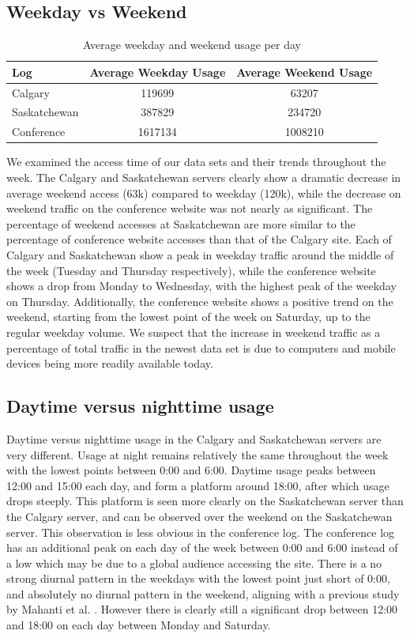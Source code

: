 \documentclass[10pt,conference]{IEEEtran}
\begin{document}
\subsection{Weekday vs Weekend} %
\label{sub:weekday_vs_weekend}
\begin{table}[h]
    \caption{Average weekday and weekend usage per day}\label{tab:weeklyusage}
    \begin{tabular}{l | c c}
        Log & Average Weekday Usage & Average Weekend Usage\\
        \hline
        Calgary & 119699 & 63207\\
        Saskatchewan & 387829 & 234720\\
        Conference & 1617134 & 1008210
    \end{tabular}
\end{table}

We examined the access time of our data sets and their trends throughout the week. The Calgary and Saskatchewan servers clearly show a dramatic decrease in average weekend access (63k) compared to weekday (120k), while the decrease on weekend traffic on the conference website was not nearly as significant. The percentage of weekend accesses at Saskatchewan are more similar to the percentage of conference website accesses than that of the Calgary site. Each of Calgary and Saskatchewan show a peak in weekday traffic around the middle of the week (Tuesday and Thursday respectively), while the conference website shows a drop from Monday to Wednesday, with the highest peak of the weekday on Thursday. Additionally, the conference website shows a positive trend on the weekend, starting from the lowest point of the week on Saturday, up to the regular weekday volume. We suspect that the increase in weekend traffic as a percentage of total traffic in the newest data set is due to computers and mobile devices being more readily available today.

\subsection{Daytime versus nighttime usage} %
\label{sub:daytime_versus_nighttime_usage}
Daytime versus nighttime usage in the Calgary and Saskatchewan servers are very different. Usage at night remains relatively the same throughout the week with the lowest points between 0:00 and 6:00. Daytime usage peaks between 12:00 and 15:00 each day, and form a platform around 18:00, after which usage drops steeply. This platform is seen more clearly on the Saskatchewan server than the Calgary server, and can be observed over the weekend on the Saskatchewan server. This observation is less obvious in the conference log. The conference log has an additional peak on each day of the week between 0:00 and 6:00 instead of a low which may be due to a global audience accessing the site. There is a no strong diurnal pattern in the weekdays with the lowest point just short of 0:00, and absolutely no diurnal pattern in the weekend, aligning with a previous study by Mahanti et al. \cite{Mahanti_Wu}. However there is clearly still a significant drop between 12:00 and 18:00 on each day between Monday and Saturday. 
\end{document}
